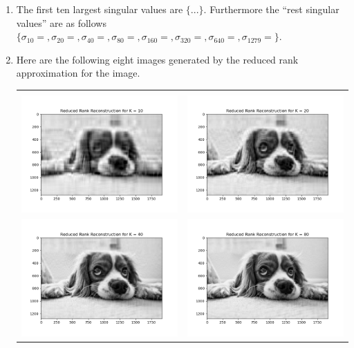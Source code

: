 \documentclass{article}
\begin{document}
\begin{enumerate}
    
    \item

    The first ten largest singular values are $\{ ... \}$. Furthermore the ``rest singular values'' are as follows $\{ \sigma_{10} = , \sigma_{20} = , \sigma_{40} = , \sigma_{80} = , \sigma_{160} = , \sigma_{320} = , \sigma_{640} = , \sigma_{1279} = \}$. 

    \item Here are the following eight images generated by the reduced rank approximation for the image. 

\begin{center}
    
    \begin{tabular}{| c | c |}
    \hline \\
    \includegraphics[width=.40\textwidth]{Image_appn_100010.png} & \includegraphics[width=.40\textwidth]{Image_appn_100020.png} \\
    \includegraphics[width=.40\textwidth]{Image_appn_100040.png} & \includegraphics[width=.40\textwidth]{Image_appn_100080.png} \\
    \hline
    \end{tabular}


\end{center}
\end{enumerate}
\end{document}
